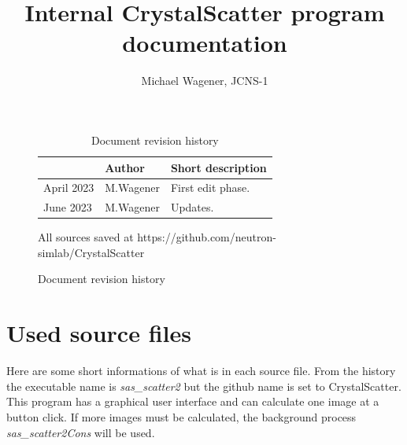 \documentclass[11pt]{article} %
\author{Michael Wagener, JCNS-1}
\title{Internal CrystalScatter program documentation}
\begin{document}
\maketitle
\tableofcontents %

\begin{figure}[b] %
\begin{longtable}{|p{2.7cm}|p{2.6cm}|p{10.3cm}|}
\caption{Document revision history} \\
\hline\rowcolor{rowcolor}{\bf Date} & {\bf Author} & {\bf Short description} \\
\endfirsthead
\hline
April 2023 & M.Wagener & First edit phase. \\ \hline
June 2023 & M.Wagener & Updates. \\ \hline
\end{longtable}

\centerline{All sources saved at https://github.com/neutron-simlab/CrystalScatter}
\end{figure}

\clearpage %


\section{Used source files}

Here are some short informations of what is in each source file. From the history the executable name is {\it sas\_scatter2} but the github name is set to CrystalScatter. This program has a graphical user interface and can calculate one image at a button click. If more images must be calculated, the background process {\it sas\_scatter2Cons} will be used.
\end{document}
